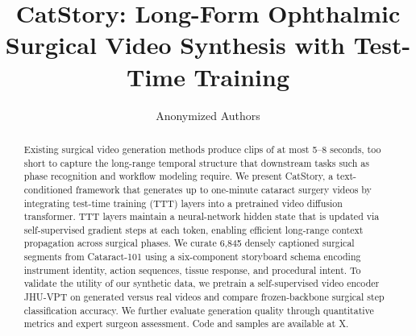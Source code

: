 \documentclass[runningheads]{llncs}
\begin{document}
%
\title{CatStory: Long-Form Ophthalmic Surgical Video Synthesis with Test-Time Training}
%

\author{Anonymized Authors}  %
  
\maketitle              %
%
\begin{abstract}
Existing surgical video generation methods produce clips of at most 5--8 seconds, too short to capture the long-range temporal structure that downstream tasks such as phase recognition and workflow modeling require. We present CatStory, a text-conditioned framework that generates up to one-minute cataract surgery videos by integrating test-time training (TTT) layers into a pretrained video diffusion transformer. TTT layers maintain a neural-network hidden state that is updated via self-supervised gradient steps at each token, enabling efficient long-range context propagation across surgical phases. We curate 6,845 densely captioned surgical segments from Cataract-101 using a six-component storyboard schema encoding instrument identity, action sequences, tissue response, and procedural intent. To validate the utility of our synthetic data, we pretrain a self-supervised video encoder JHU-VPT on generated versus real videos and compare frozen-backbone surgical step classification accuracy. We further evaluate generation quality through quantitative metrics and expert surgeon assessment. Code and samples are available at X.


\end{abstract}
%
%
%
\end{document}
